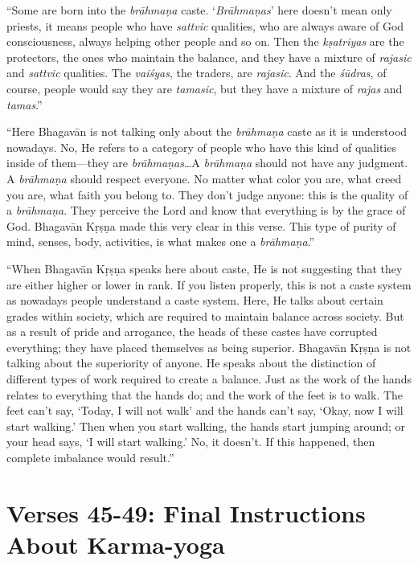 \documentclass[12pt, twoside, openright]{memoir}
\begin{document}
\enquote{Some are born into the \textit{brāhmaṇa} caste. \enquote{\textit{Brāhmaṇas}} here doesn’t mean only priests, it means people who have \textit{sattvic} qualities, who are always aware of God consciousness, always helping other people and so on. Then the \textit{kṣatriyas} are the protectors, the ones who maintain the balance, and they have a mixture of \textit{rajasic} and \textit{sattvic} qualities. The \textit{vaiśyas}, the traders, are \textit{rajasic}. And the \textit{śūdras}, of course, people would say they are \textit{tamasic}, but they have a mixture of \textit{rajas} and \textit{tamas}.}

\enquote{Here Bhagavān is not talking only about the \textit{brāhmaṇa} caste as it is understood nowadays. No, He refers to a category of people who have this kind of qualities inside of them---they are \textit{brāhmaṇas}\ldots A \textit{brāhmaṇa} should not have any judgment. A \textit{brāhmaṇa} should respect everyone. No matter what color you are, what creed you are, what faith you belong to. They don’t judge anyone: this is the quality of a \textit{brāhmaṇa}. They perceive the Lord and know that everything is by the grace of God. Bhagavān Kṛṣṇa made this very clear in this verse. This type of purity of mind, senses, body, activities, is what makes one a \textit{brāhmaṇa}.}

\enquote{When Bhagavān Kṛṣṇa speaks here about caste, He is not suggesting that they are either higher or lower in rank. If you listen properly, this is not a caste system as nowadays people understand a caste system. Here, He talks about certain grades within society, which are required to maintain balance across society. But as a result of pride and arrogance, the heads of these castes have corrupted everything; they have placed themselves as being superior. Bhagavān Kṛṣṇa is not talking about the superiority of anyone. He speaks about the distinction of different types of work required to create a balance. Just as the work of the hands relates to everything that the hands do; and the work of the feet is to walk. The feet can’t say, \enquote{Today, I will not walk} and the hands can’t say, \enquote{Okay, now I will start walking.} Then when you start walking, the hands start jumping around; or your head says, \enquote{I will start walking.} No, it doesn’t. If this happened, then complete imbalance would result.}

\section{Verses 45-49: Final Instructions About Karma-yoga}\label{sec-verses-45-49-final-instructions-about-karma-yoga}
\end{document}

